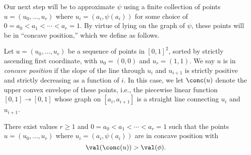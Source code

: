\documentclass[11pt]{article}
\begin{document}
Our next step will be to approximate $\psi$ using a finite collection of points $u = (u_0,\ldots,u_r)$ where $u_i = (a_i,\psi(a_i))$ for some choice of $0 = a_0 < a_1 < \cdots < a_r = 1$. By virtue of lying on the graph of $\psi$, these points will be in ``concave position,'' which we define as follows.
\begin{definition}
Let $u = (u_0,\ldots,u_r)$ be a sequence of points in $[0,1]^2$, sorted by strictly ascending first coordinate, with $u_0 = (0,0)$ and $u_r = (1,1)$. We say $u$ is in \emph{concave position} if the slope of the line through $u_i$ and $u_{i+1}$ is strictly positive and strictly decreasing as a function of $i$. In this case, we let $\conc(u)$ denote the upper convex envelope of these points, i.e., the piecewise linear function $[0,1] \to [0,1]$ whose graph on $[a_i,a_{i+1}]$ is a straight line connecting $u_i$ and $u_{i+1}$.
\end{definition}

\begin{lemma}\label{lem:construct-u}
There exist values $r \ge 1$ and $0 = a_0 < a_1 < \cdots < a_r = 1$ such that the points $u = (u_0,\ldots,u_r)$ where $u_i = (a_i,\psi(a_i))$ are in concave position with
\[ \val(\conc(u)) > \val(\phi). \]
\end{lemma}
\end{document}
